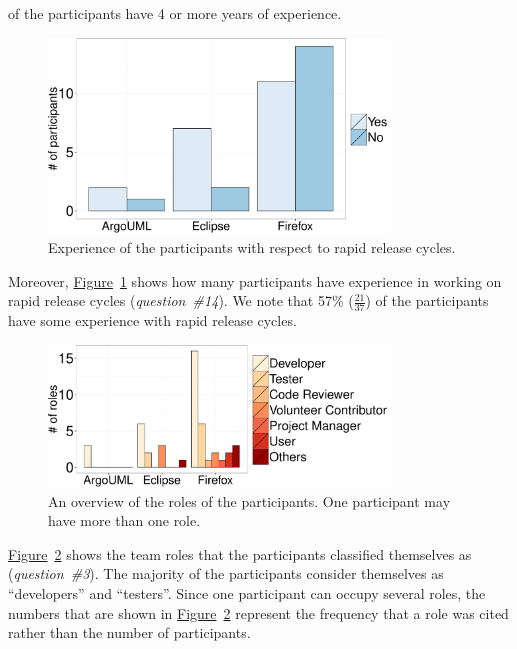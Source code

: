 of the participants have 4 or more years of experience. 
\begin{figure}
	\centering
	\includegraphics[width=0.80\textwidth,keepaspectratio] 
	{chapters/chapter5/figures/demographic_rapid_releases.pdf}
	\caption{Experience of the participants with respect to rapid release
	cycles.}
	\label{fig:demographics_rapid_releases}
\end{figure}
Moreover,
\hyperref[fig:demographics_rapid_releases]{Figure}~\ref{fig:demographics_rapid_releases}
shows how many participants have experience in working on rapid release cycles
({\em question~\#14}). We note that 57\% ($\frac{21}{37}$) of the participants
have some experience with rapid release cycles.
\begin{figure}
	\centering
	\includegraphics[width=0.80\textwidth,keepaspectratio] 
	{chapters/chapter5/figures/roles_demographics.pdf}
	\caption{An overview of the roles of the participants. One participant
	may have more than one role.}
	\label{fig:roles_demographics}
\end{figure}
\hyperref[fig:roles_demographics]{Figure}~\ref{fig:roles_demographics} shows the
team roles that the participants classified themselves as ({\em question~\#3}).
The majority of the participants consider themselves as ``developers'' and
``testers''. Since one participant can occupy several roles, the numbers that
are shown in
\hyperref[fig:roles_demographics]{Figure}~\ref{fig:roles_demographics} represent
the frequency that a role was cited rather than the number of participants.
